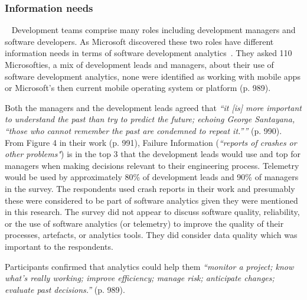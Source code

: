 \subsubsection{Information needs}~\label{rw-information-needs-research}
Development teams comprise many roles including development managers and software developers. As Microsoft discovered these two roles have different information needs in terms of software development analytics~. They asked 110 Microsofties, a mix of development leads and managers, about their use of software development analytics, none were identified as working with mobile apps or Microsoft's then current mobile operating system or platform (p. 989). 

Both the managers and the development leads agreed that \emph{``it [is] more important to understand the past than try to predict the future; echoing George Santayana, ``those who cannot remember the past are condemned to repeat it.''''} (p. 990). From Figure 4 in their work (p. 991), Failure Information (\emph{``reports of crashes or other problems"}) is in the top 3 that the development leads would use and top for managers when making decisions relevant to their engineering process. Telemetry would be used by approximately 80\% of development leads and 90\% of managers in the survey. The respondents used crash reports in their work and presumably these were considered to be part of software analytics given they were mentioned in this research. The survey did not appear to discuss software quality, reliability, or the use of software analytics (or telemetry) to improve the quality of their processes, artefacts, or analytics tools. They did consider data quality which was important to the respondents.

Participants confirmed that analytics could help them \emph{``monitor a project; know what's really working; improve efficiency; manage risk; anticipate changes; evaluate past decisions.''} (p. 989).

